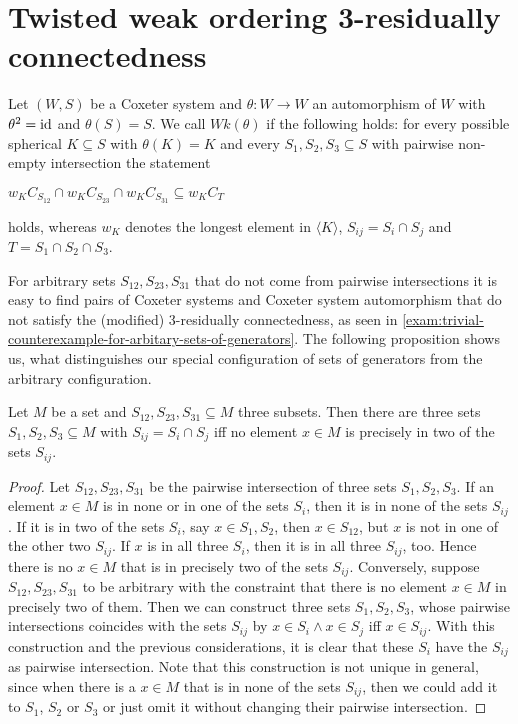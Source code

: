 \chapter{Twisted weak ordering 3-residually connectedness}
\label{sec:main-thesis}

\begin{defi}
	Let $(W,S)$ be a Coxeter system and $\theta : W \to W$ an automorphism of $W$ with $\theta^2 = \operatorname{id}$ and $\theta(S) = S$. We call $Wk(\theta)$  if the following holds: for every possible spherical $K \subseteq S$ with $\theta(K) = K$ and every $S_1,S_2,S_3 \subseteq S$ with pairwise non-empty intersection the statement
	\begin{axioms}
		 $w_K C_{S_{12}} \cap w_K C_{S_{23}} \cap w_K C_{S_{31}} \subseteq w_K C_T$
	\end{axioms}
	holds, whereas $w_K$ denotes the longest element in $\langle K \rangle$, $S_{ij} = S_i \cap S_j$ and $T = S_1 \cap S_2 \cap S_3$.
\end{defi}

For arbitrary sets $S_{12},S_{23},S_{31}$ that do not come from pairwise intersections it is easy to find pairs of Coxeter systems and Coxeter system automorphism that do not satisfy the (modified) 3-residually connectedness, as seen in \ref{exam:trivial-counterexample-for-arbitary-sets-of-generators}. The following proposition shows us, what distinguishes our special configuration of sets of generators from the arbitrary configuration.

\begin{prop}
	Let $M$ be a set and $S_{12},S_{23},S_{31} \subseteq M$ three subsets. Then there are three sets $S_1,S_2,S_3 \subseteq M$ with $S_{ij} = S_i \cap S_j$ iff no element $x \in M$ is precisely in two of the sets $S_{ij}$.

	\begin{proof}
		Let $S_{12},S_{23},S_{31}$ be the pairwise intersection of three sets $S_1,S_2,S_3$. If an element $x \in M$ is in none or in one of the sets $S_i$, then it is in none of the sets $S_{ij}$. If it is in two of the sets $S_i$, say $x \in S_1,S_2$, then $x \in S_{12}$, but $x$ is not in one of the other two $S_{ij}$. If $x$ is in all three $S_i$, then it is in all three $S_{ij}$, too. Hence there is no $x \in M$ that is in precisely two of the sets $S_{ij}$. Conversely, suppose $S_{12},S_{23},S_{31}$ to be arbitrary with the constraint that there is no element $x \in M$ in precisely two of them. Then we can construct three sets $S_1,S_2,S_3$, whose pairwise intersections coincides with the sets $S_{ij}$ by $x \in S_i \wedge x \in S_j$ iff $x \in S_{ij}$. With this construction and the previous considerations, it is clear that these $S_i$ have the $S_{ij}$ as pairwise intersection. Note that this construction is not unique in general, since when there is a $x \in M$ that is in none of the sets $S_{ij}$, then we could add it to $S_1$, $S_2$ or $S_3$ or just omit it without changing their pairwise intersection.
	\end{proof}
\end{prop}



